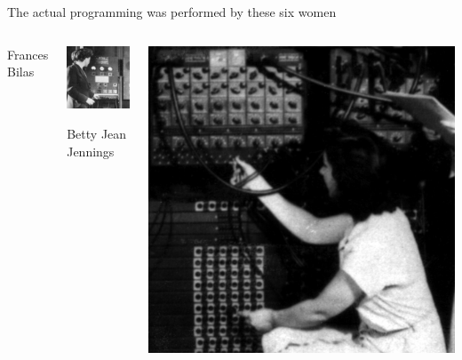\documentclass[aspectratio=169]{beamer}
\begin{document}
\begin{frame}{The actual programming was performed by these six women}
\begin{columns}[t]
\begin{center}
Frances Bilas
\end{center}

\begin{center}
\includegraphics[width=\linewidth]{Betty-Jennings.jpg}

Betty Jean Jennings
\end{center}

\begin{center}
\includegraphics[width=\linewidth]{Ruth-Lichterman.jpg}


\end{center}
\end{columns}
\end{frame}
\end{document}
